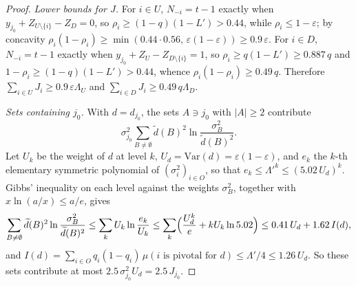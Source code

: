 \documentclass[11pt]{amsart}
\theoremstyle{definition}
\theoremstyle{remark}
\newcommand{\Var}{\mathrm{Var}}
\begin{document}
\begin{proof}
\emph{Lower bounds for $J$.} For $i\in U$, $N_{-i}=t-1$ exactly when $y_{j_0}+Z_{U\setminus\{i\}}-Z_D=0$, so
$\rho_i\ge(1-q)(1-L')>0.44$, while $\rho_i\le1-\varepsilon$; by concavity
$\rho_i(1-\rho_i)\ge\min(0.44\cdot0.56,\,\varepsilon(1-\varepsilon))\ge0.9\,\varepsilon$. For $i\in D$, $N_{-i}=t-1$
exactly when $y_{j_0}+Z_U-Z_{D\setminus\{i\}}=1$, so $\rho_i\ge q(1-L')\ge0.887\,q$ and $1-\rho_i\ge(1-q)(1-L')>0.44$,
whence $\rho_i(1-\rho_i)\ge0.49\,q$. Therefore $\sum_{i\in U}J_i\ge0.9\,\varepsilon\Lambda_U$ and
$\sum_{i\in D}J_i\ge0.49\,q\Lambda_D$.

\emph{Sets containing $j_0$.} With $d=d_{j_0}$, the sets $A\ni j_0$ with $|A|\ge2$ contribute
\[
\sigma_{j_0}^2\sum_{B\ne\emptyset}\widetilde d(B)^2\ln\frac{\sigma_B^2}{\widetilde d(B)^2}.
\]
Let $U_k$ be the weight of $d$ at level $k$, $U_d=\Var(d)=\varepsilon(1-\varepsilon)$, and $e_k$ the $k$-th elementary symmetric polynomial of
$(\sigma_i^2)_{i\in O}$, so that $e_k\le\Lambda'^k\le(5.02\,U_d)^k$. Gibbs' inequality on each level against the
weights $\sigma_B^2$, together with $x\ln(a/x)\le a/e$, gives
\[
\sum_{B\ne\emptyset}\widetilde d(B)^2\ln\frac{\sigma_B^2}{\widetilde d(B)^2}\le\sum_kU_k\ln\frac{e_k}{U_k}
\le\sum_k\Bigl(\frac{U_d^k}e+kU_k\ln5.02\Bigr)\le0.41\,U_d+1.62\,I(d),
\]
and $I(d)=\sum_{i\in O}q_i(1-q_i)\,\mu(i\text{ is pivotal for }d)\le\Lambda'/4\le1.26\,U_d$. So these sets contribute
at most $2.5\,\sigma_{j_0}^2U_d=2.5\,J_{j_0}$.


\end{proof}
\end{document}
